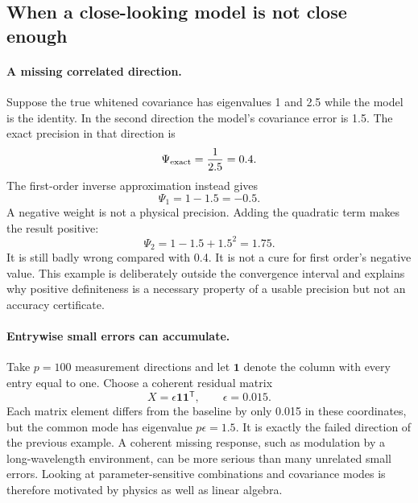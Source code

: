 \documentclass[11pt]{article}
\newcommand{\T}{^{\mathsf{T}}}
\begin{document}
\subsection{When a close-looking model is not close enough}
\paragraph{A missing correlated direction.}
Suppose the true whitened covariance has eigenvalues 1 and 2.5 while the
model is the identity. In the second direction the model's covariance
error is 1.5. The exact precision in that direction is
\begin{equation}
 \Psi_{\rm exact}=\frac1{2.5}=0.4.
\end{equation}
The first-order inverse approximation instead gives
\begin{equation}
 \Psi_1=1-1.5=-0.5.
\end{equation}
A negative weight is not a physical precision. Adding the quadratic term
makes the result positive:
\begin{equation}
 \Psi_2=1-1.5+1.5^2=1.75.
\end{equation}
It is still badly wrong compared with 0.4. It is not a
cure for first order's negative value. This example is deliberately outside
the convergence interval and explains why positive definiteness is a
necessary property of a usable precision but not an accuracy certificate.

\paragraph{Entrywise small errors can accumulate.}
Take $p=100$ measurement directions and let $\boldsymbol 1$ denote the
column with every entry equal to one. Choose a coherent residual matrix
\begin{equation}
 X=\epsilon\boldsymbol 1\boldsymbol 1\T,
 \qquad \epsilon=0.015.
\end{equation}
Each matrix element differs from the baseline by only 0.015 in these
coordinates, but the common mode has eigenvalue $p\epsilon=1.5$.
It is exactly the failed direction of the previous example. A coherent
missing response, such as modulation by a long-wavelength environment,
can be more serious than many unrelated small errors. Looking at
parameter-sensitive combinations and covariance modes is therefore
motivated by physics as well as linear algebra.
\end{document}
